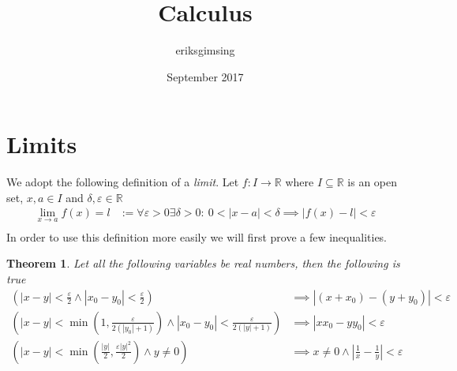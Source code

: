 \documentclass{article}
\title{Calculus}
\author{eriksgimsing }
\date{September 2017}
\newtheorem{theorem}{Theorem}[section]
\begin{document}
\maketitle
\section{Limits}
We adopt the following definition of a \textit{limit}. Let $f: I
\rightarrow \mathbb{R}$ where $I \subseteq \mathbb{R}$ is an open set,
$x,a \in I$ and $\delta,\varepsilon \in \mathbb{R}$
\begin{align*}
    \lim_{x \rightarrow a} f(x) = l &:= \forall \varepsilon > 0 \exists
    \delta > 0:\  0 < |x-a| < \delta \implies |f(x)-l| < \varepsilon \\
\end{align*}  
In order to use this definition more easily we will first prove a few
inequalities.
\begin{theorem}
Let all the following variables be real numbers, then the following is true
\begin{align*}
    \left(|x-y| < \frac{\varepsilon}{2} \land |x_0-y_0| <
    \frac{\varepsilon}{2}\right)
        &\implies |(x+x_0)-(y+y_0)| < \varepsilon \\
    \left(|x-y| < \min \left(1, \frac{\varepsilon}{2(|y_0|+1)} \right)
    \land |x_0-y_0| < \frac{\varepsilon}{2(|y|+1)}\right)
        &\implies |xx_0-yy_0| < \varepsilon \\
    \left(|x-y| < \min \left( \frac{|y|}{2},
    \frac{\varepsilon|y|^2}{2}\right) \land y \neq 0 \right)
        &\implies x \neq 0 \land \left| \frac{1}{x} - \frac{1}{y}\right|
        < \varepsilon
\end{align*}
\end{theorem}
\end{document}
